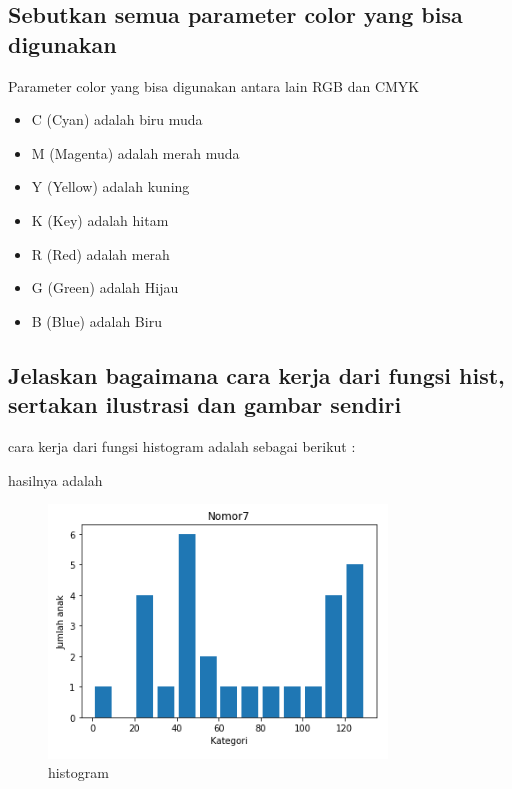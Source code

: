 \subsection{Sebutkan semua parameter color yang bisa digunakan}
Parameter color yang bisa digunakan antara lain RGB dan CMYK
\begin{itemize}
    \item C (Cyan) adalah biru muda
    \item M (Magenta) adalah merah muda
    \item Y (Yellow) adalah kuning
    \item K (Key) adalah hitam
    \item R (Red) adalah merah
    \item G (Green) adalah Hijau
    \item B (Blue) adalah Biru
\end{itemize}

\subsection{Jelaskan bagaimana cara kerja dari fungsi hist, sertakan ilustrasi dan gambar sendiri}
cara kerja dari fungsi histogram adalah sebagai berikut :

hasilnya adalah
\begin{figure}[H]
    \includegraphics[width=9cm]{figures/6/Teori/1174004/7his.png}
    \caption{histogram}
    \centering
\end{figure}


